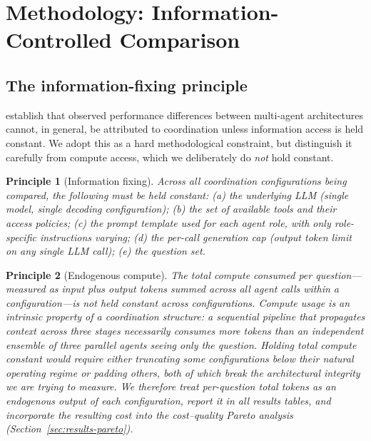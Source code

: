 \documentclass[11pt]{article}
\newtheorem{principle}{Principle}
\begin{document}
\section{Methodology: Information-Controlled Comparison}
\label{sec:method}

\subsection{The information-fixing principle}
\label{sec:method-principle}

\citet{reliability2026} establish that observed performance differences between multi-agent architectures cannot, in general, be attributed to coordination unless information access is held constant. We adopt this as a hard methodological constraint, but distinguish it carefully from compute access, which we deliberately do \emph{not} hold constant.

\begin{principle}[Information fixing]
Across all coordination configurations being compared, the following must be held constant: (a) the underlying LLM (single model, single decoding configuration); (b) the set of available tools and their access policies; (c) the prompt template used for each agent role, with only role-specific instructions varying; (d) the per-call generation cap (output token limit on any single LLM call); (e) the question set.
\label{prin:fixing}
\end{principle}

\begin{principle}[Endogenous compute]
The total compute consumed per question---measured as input plus output tokens summed across all agent calls within a configuration---is \emph{not} held constant across configurations. Compute usage is an intrinsic property of a coordination structure: a sequential pipeline that propagates context across three stages necessarily consumes more tokens than an independent ensemble of three parallel agents seeing only the question. Holding total compute constant would require either truncating some configurations below their natural operating regime or padding others, both of which break the architectural integrity we are trying to measure. We therefore treat per-question total tokens as an \emph{endogenous output} of each configuration, report it in all results tables, and incorporate the resulting cost into the cost--quality Pareto analysis (Section~\ref{sec:results-pareto}).
\label{prin:compute}
\end{principle}
\end{document}
